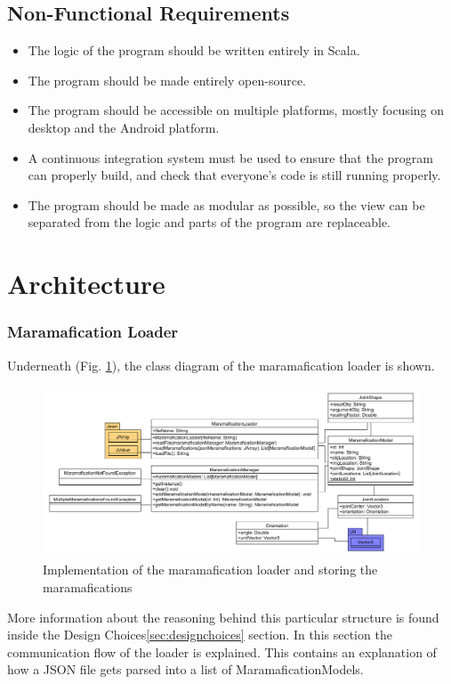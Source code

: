 \documentclass[10pt]{extarticle} %
\begin{document}
    \subsection{Non-Functional Requirements}
    \begin{itemize}
        \item The logic of the program should be written entirely in Scala.
        \item The program should be made entirely open-source.
        \item The program should be accessible on multiple platforms, mostly focusing on desktop and the Android platform.
        \item A continuous integration system must be used to ensure that the program can properly build, and check that everyone's code is still running properly.
        \item The program should be made as modular as possible, so the view can be separated from the logic and parts of the program are replaceable.
    \end{itemize}
    \newpage

    \section{Architecture}

    \subsubsection{Maramafication Loader}
    Underneath (Fig. \ref{fig:me}), the class diagram of the maramafication loader is shown.

    \begin{figure}[htb]
        \centering
        \includegraphics[width=\textwidth, height=\textheight, keepaspectratio]{Marama-Editor}
        \caption{Implementation of the maramafication loader and storing the maramafications}
        \label{fig:me}
    \end{figure}
    More information about the reasoning behind this particular structure is found inside the Design Choices\ref{sec:designchoices} section.
    In this section the communication flow of the loader is explained.
    This contains an explanation of how a JSON file gets parsed into a list of MaramaficationModels.
\end{document}

